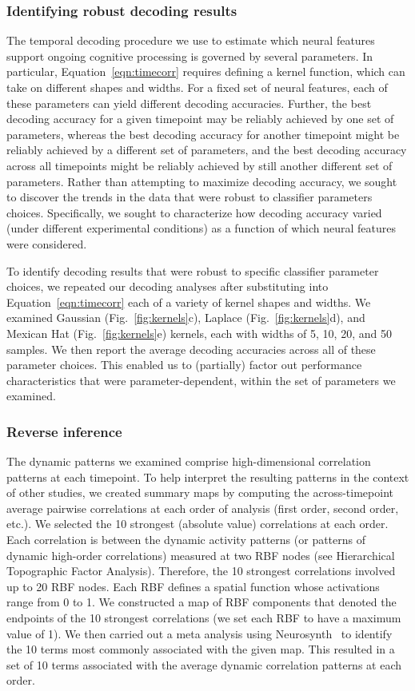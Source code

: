 \documentclass[english]{article}
\begin{document}
\subsubsection*{Identifying robust decoding results}
The temporal decoding procedure we use to estimate which neural
features support ongoing cognitive processing is governed by several
parameters. In particular, Equation~\ref{eqn:timecorr} requires
defining a kernel function, which can take on different shapes and
widths.  For a fixed set of neural features, each of these parameters
can yield different decoding accuracies.  Further, the best decoding
accuracy for a given timepoint may be reliably achieved by one set of
parameters, whereas the best decoding accuracy for another timepoint
might be reliably achieved by a different set of parameters, and the
best decoding accuracy across all timepoints might be
reliably achieved by still another different set of parameters.
Rather than attempting to maximize decoding accuracy, we sought to
discover the trends in the data that were robust to classifier
parameters choices.  Specifically, we sought to characterize how
decoding accuracy varied (under different experimental conditions) as
a function of which neural features were considered.

To identify decoding results that were robust to specific classifier
parameter choices, we repeated our decoding analyses after
substituting into Equation~\ref{eqn:timecorr} each of a variety of
kernel shapes and widths.  We examined Gaussian
(Fig.~\ref{fig:kernels}c), Laplace (Fig.~\ref{fig:kernels}d), and
Mexican Hat (Fig.~\ref{fig:kernels}e) kernels, each with widths of 5,
10, 20, and 50 samples.  We then report the average decoding
accuracies across all of these parameter choices.  This enabled us to
(partially) factor out performance characteristics that were
parameter-dependent, within the set of parameters we examined.


\subsubsection*{Reverse inference}
The dynamic patterns we examined comprise high-dimensional correlation
patterns at each timepoint.  To help interpret the resulting patterns
in the context of other studies, we created summary maps by computing
the across-timepoint average pairwise correlations at each order of
analysis (first order, second order, etc.).  We selected the 10
strongest (absolute value) correlations at each order.  Each
correlation is between the dynamic activity patterns (or patterns of
dynamic high-order correlations) measured at two RBF nodes (see
Hierarchical Topographic Factor Analysis).  Therefore, the 10
strongest correlations involved up to 20 RBF nodes.  Each RBF defines
a spatial function whose activations range from 0 to 1.  We
constructed a map of RBF components that denoted the endpoints of the
10 strongest correlations (we set each RBF to have a maximum value of
1).  We then carried out a meta analysis using
Neurosynth~\citep{RubiEtal17} to identify the 10 terms most commonly
associated with the given map.  This resulted in a set of 10 terms
associated with the average dynamic correlation patterns at each
order.
\end{document}
